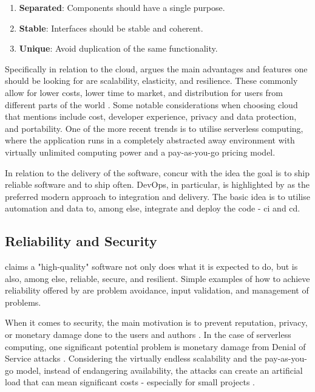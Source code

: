 \begin{enumerate}
    \item \textbf{Separated}: Components should have a single purpose.
    \item \textbf{Stable}: Interfaces should be stable and coherent.
    \item \textbf{Unique}: Avoid duplication of the same functionality.
\end{enumerate}

Specifically in relation to the cloud, \textcite[Chapter~5]{Sommerville_2019} argues the main advantages and features one should be looking for are scalability, elasticity, and resilience.
These commonly allow for lower costs, lower time to market, and distribution for users from different parts of the world \parencite[Chapter~5]{Sommerville_2019}.
Some notable considerations when choosing cloud that \textcite[Chapter~5]{Sommerville_2019} mentions include cost, developer experience, privacy and data protection, and portability.
One of the more recent trends is to utilise serverless computing, where the application runs in a completely abstracted away environment with virtually unlimited computing power and a pay-as-you-go pricing model.

In relation to the delivery of the software, \textcites[Chapter~10]{Sommerville_2019}[Chapter~7]{Fogel_2022} concur with the idea the goal is to ship reliable software and to ship often.
DevOps, in particular, is highlighted by \textcite[Chapter~10]{Sommerville_2019} as the preferred modern approach to integration and delivery.
The basic idea is to utilise automation and data to, among else, integrate and deploy the code - \gls{ci} and \gls{cd}.

\subsection{Reliability and Security}

\textcite[Chapter~8]{Sommerville_2019} claims a "high-quality" software not only does what it is expected to do, but is also, among else, reliable, secure, and resilient.
Simple examples of how to achieve reliability offered by \textcite[Chapter~8]{Sommerville_2019} are problem avoidance, input validation, and management of problems.

When it comes to security, the main motivation is to prevent reputation, privacy, or monetary damage done to the users and authors \textcite[Chapter~7]{Sommerville_2019}.
In the case of serverless computing, one significant potential problem is monetary damage from Denial of Service attacks \parencite{Kelly2021}.
Considering the virtually endless scalability and the pay-as-you-go model, instead of endangering availability, the attacks can create an artificial load that can mean significant costs - especially for small projects \parencite{Kelly2021}.

